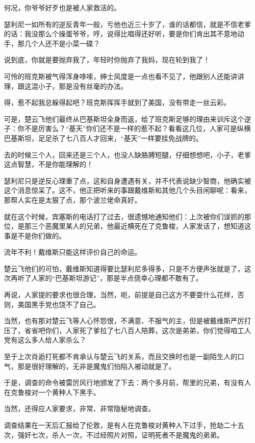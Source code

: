 何况，你爷爷好歹也是被人家救活的。

瑟利尼一如所有的逆反青年一般，亏他也近三十岁了，谁的话都信，就是不信老爹的话：我没那么个操蛋爷爷，哼，说得比唱得还好听，要是你们肯出其不意地动手，那几个人还不是小菜一碟？

说到底，你就是要抛弃我了，年轻时你抛弃了我妈，现在轮到我了！

可怜的班克斯被气得浑身哆嗦，绅士风度是一点也看不见了，他跟别人还能讲讲理，跟这混小子，那是没有丝毫的办法。

得，惹不起我总躲得起吧？班克斯挥挥手就到了美国，没有带走一丝云彩。

可是，楚云飞他们最终从巴基斯坦全身而返，给了班克斯足够的理由来训斥这个逆子：你不是厉害么？“基天”你们还不是一样的惹不起？看看这几位，人家可是纵横巴基斯坦，足足杀了七八百人才回来，“基天”一样要挂免战牌的。

去的时候三个人，回来还是三个人，也没人缺胳膊短腿，仔细想想吧，小子，老爹这点智慧，不是你能理解的！

瑟利尼只是逆反心理重了点，这和自身遭遇有关，并不代表说缺少智商，他确实被这个消息惊呆了。这不，他正把听来的事跟戴维斯和其他几个头目闲聊呢：看来，那帮人实在是太狠了点，那个波兰佬命真好。

就在这个时候，宾塞斯的电话打了过去，很遗憾地通知他们：上次被你们误抓的那位，是那三个恶魔里某人的兄弟，他最近横死在了克鲁梭，人家发话了，想知道这事是不是你们做的。

流年不利！戴维斯只能这样评价自己的命运。

楚云飞他们的可怕，戴维斯知道得要比瑟利尼多得多，只是不方便声张就是了，这次再听了人家的“巴基斯坦游记”，那是半点侥幸心理都不敢有了。

再说，人家提的要求也很合理，当然，呃，前提是自己这方不要耍什么花样，否则，美国黑手党也饶不了自己。

当然，也有那对楚云飞等人心怀怨恨，不满意、不服气的主，但是被戴维斯严厉打压了，省省吧你们，人家死了爹拉了七八百人陪葬，这次是弟弟，你们觉得咱工人党有这么多人给人家杀么？

至于上次肖逅打死都不肯承认与楚云飞的关系，而且交换时也是一副陌生人的口气，那是很好理解的，无非是魔鬼们怕陷入被动就是了。

于是，调查的命令被雷厉风行地颁发了下去：两个多月前，帮里的兄弟，有没有人在克鲁梭对一个黄种人下黑手。

当然，还得应人家要求，非常、非常隐秘地调查。

调查结果在一天后汇报给了伦敦，是有人在克鲁梭对黄种人下过手，抢劫二十五次，强奸七次，杀人一次，不过经照片对照，证明死者不是魔鬼的弟弟。

